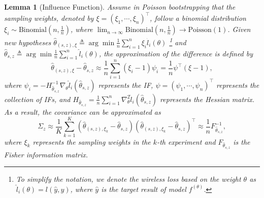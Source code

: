 \documentclass[lettersize,journal]{IEEEtran}
\theoremstyle{definition}
\theoremstyle{plain}
\newtheorem{lemma}{Lemma}
\begin{document}
\begin{lemma}[Influence Function]
    \label{thm:IF}
    Assume in Poisson bootstrapping that the sampling weights, denoted by ${\xi}=(\xi_1,\cdots,\xi_n)^\top$, follow a binomial distribution $\xi_i\sim \text{Binomial}(n,\frac{1}{n})$, where $\lim_{n\to\infty} \text{Binomial}(n,\frac{1}{n})\to\text{Poisson}(1)$. 
    Given new hypotheses $\hat{\theta}_{(s,z),{\xi}}\triangleq \arg\min \frac{1}{n}\sum_{i=1}^n \xi_i \hat{l}_i(\theta)$ \footnote{To simplify the notation, we denote the wireless loss based on the weight $\theta$ as $\hat{l}_i(\theta) = l(\hat{y}, y)$, where $\hat{y}$ is the target result of model $f^{(\theta)}$.} and $\hat{\theta}_{s,z}\triangleq \arg\min \frac{1}{n}\sum_{i=1}^n \hat{l}_i(\theta)$, the approximation of the difference is defined by
    \begin{equation}
        \label{equ:IF}
        \hat{\theta}_{(s,z),{\xi}} - \hat{\theta}_{s,z} \approx \frac{1}{n}\sum_{i=1}^n (\xi_i-1)\psi_i = \frac{1}{n}{\psi}^\top({\xi}-{1}),
    \end{equation}
    where $\psi_i = -{H}_{\hat{\theta}_{s,z}}^{-1}\nabla_\theta \hat{l}_i(\hat{\theta}_{s,z})$ represents the IF, ${\psi} = (\psi_1,\cdots,\psi_n)^\top$ represents the collection of IFs, and ${H}_{\hat{\theta}_{s,z}} = \frac{1}{n}\sum_{i=1}^n\nabla_\theta^2\hat{l}_i(\hat{\theta}_{s,z})$ represents the Hessian matrix. As a result, the covariance can be approximated as
    \begin{equation}
        \label{equ:fisher_approx}
        \Sigma_z \approx \frac{1}{K} \sum_{k=1}^K\left(\hat{\theta}_{(s,z),{\xi}_k}-\hat{\theta}_{s,z}\right)\left(\hat{\theta}_{(s,z),{\xi}_k}-\hat{\theta}_{s,z}\right)^{\top} \approx \frac{1}{n}{F}_{\hat{\theta}_{s,z}}^{-1},
    \end{equation}
    where ${\xi}_k$ represents the sampling weights in the $k$-th experiment and ${F}_{\hat{\theta}_{s,z}}$ is the Fisher information matrix.
\end{lemma}
\end{document}
